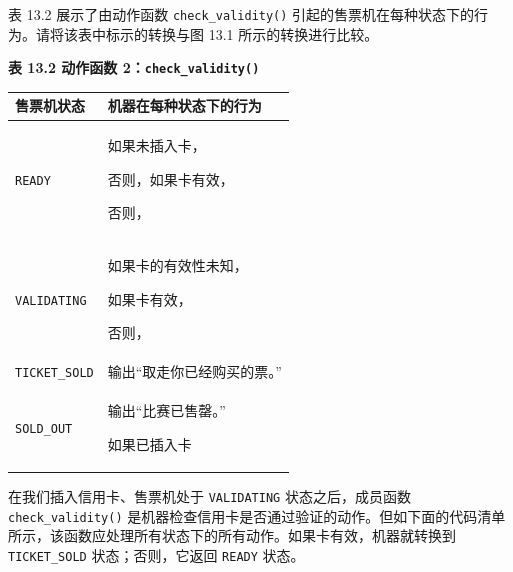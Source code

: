 表 13.2 展示了由动作函数 \texttt{check\_\allowbreak{}validity(\allowbreak{})\allowbreak{}} 引起的售票机在每种状态下的行为。请将该表中标示的转换与图 13.1 所示的转换进行比较。

\begin{center}
{\bfseries 表 13.2 动作函数 2：\texttt{check\_\allowbreak{}validity(\allowbreak{})\allowbreak{}}}\par\vspace{3bp}
\begin{tabularx}{\textwidth}{XX}
\toprule
售票机状态 & 机器在每种状态下的行为 \\
\midrule
\texttt{READY} & 如果未插入卡，\par 否则，如果卡有效，\par 否则， \\
\texttt{VALIDATING} & 如果卡的有效性未知，\par 如果卡有效，\par 否则， \\
\texttt{TICKET\_\allowbreak{}SOLD} & 输出“取走你已经购买的票。” \\
\texttt{SOLD\_OUT} & 输出“比赛已售罄。”\par 如果已插入卡 \\
\bottomrule
\end{tabularx}
\end{center}

在我们插入信用卡、售票机处于 \texttt{VALIDATING} 状态之后，成员函数 \texttt{check\_\allowbreak{}validity(\allowbreak{})\allowbreak{}} 是机器检查信用卡是否通过验证的动作。但如下面的代码清单所示，该函数应处理所有状态下的所有动作。如果卡有效，机器就转换到 \texttt{TICKET\_\allowbreak{}SOLD} 状态；否则，它返回 \texttt{READY} 状态。

